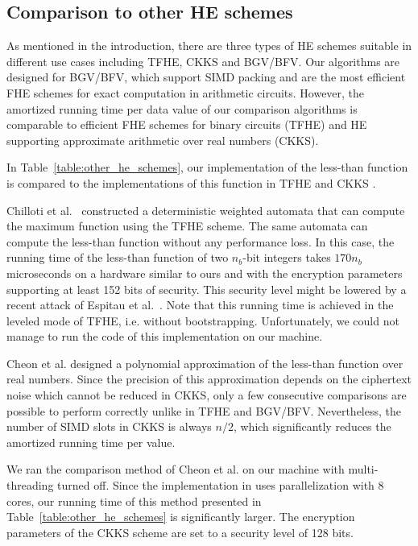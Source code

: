 \subsection{Comparison to other HE schemes}
    As mentioned in the introduction, there are three types of HE schemes suitable in different use cases including TFHE, CKKS and BGV/BFV.
    Our algorithms are designed for BGV/BFV, which support SIMD packing and are the most efficient FHE schemes for exact computation in arithmetic circuits.
    However, the amortized running time per data value of our comparison algorithms is comparable to efficient FHE schemes for binary circuits (TFHE) and HE supporting approximate arithmetic over real numbers (CKKS). 

    In Table~\ref{table:other_he_schemes}, our implementation of the less-than function is compared to the implementations of this function in TFHE \cite{AC:CGGI17,JC:CGGI20} and CKKS \cite{EPRINT:CheKimKim19}.

    Chilloti et al.~\cite{AC:CGGI17,JC:CGGI20} constructed a deterministic weighted automata that can compute the maximum function using the TFHE scheme.
    The same automata can compute the less-than function without any performance loss. 
    In this case, the running time of the less-than function of two $n_b$-bit integers takes $170 n_b$ microseconds on a hardware similar to ours and with the encryption parameters supporting at least 152 bits of security.
    This security level might be lowered by a recent attack of Espitau et al.~\cite{EPRINT:EJK20}.
    Note that this running time is achieved in the leveled mode of TFHE, i.e. without bootstrapping.
    Unfortunately, we could not manage to run the code of this implementation on our machine.

    Cheon et al. \cite{EPRINT:CheKimKim19} designed a polynomial approximation of the less-than function over real numbers.
    Since the precision of this approximation depends on the ciphertext noise which cannot be reduced in CKKS, only a few consecutive comparisons are possible to perform correctly unlike in TFHE and BGV/BFV.
    Nevertheless, the number of SIMD slots in CKKS is always $n/2$, which significantly reduces the amortized running time per value.

    We ran the comparison method of Cheon et al. on our machine with multi-threading turned off. 
    Since the implementation in \cite{EPRINT:CheKimKim19} uses parallelization with 8 cores, our running time of this method presented in Table~\ref{table:other_he_schemes} is significantly larger.
    The encryption parameters of the CKKS scheme are set to a security level of 128 bits.

